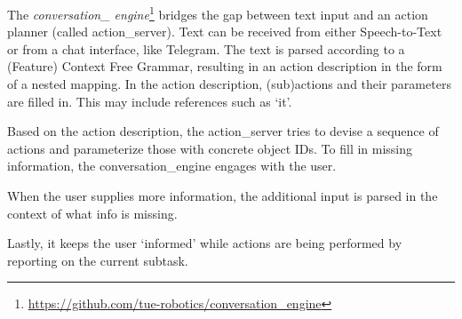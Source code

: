 \label{ssec:conversation}
The \emph{conversation\_ engine}\footnote{\url{https://github.com/tue-robotics/conversation_engine}} bridges the gap between text input and an action planner (called action\_server). Text can be received from either Speech-to-Text or from a chat interface, like Telegram\texttrademark\hspace{0em}. The text is parsed according to a (Feature) Context Free Grammar, resulting in an action description in the form of a nested mapping. In the action description, (sub)actions and their parameters are filled in.
This may include references such as `it'.

Based on the action description, the action\_server tries to devise a sequence of actions and parameterize those with concrete object IDs.
To fill in missing information, the conversation\_engine engages with the user.

When the user supplies more information, the additional input is parsed in the context of what info is missing.%

Lastly, it keeps the user `informed' while actions are being performed by reporting on the current subtask.
